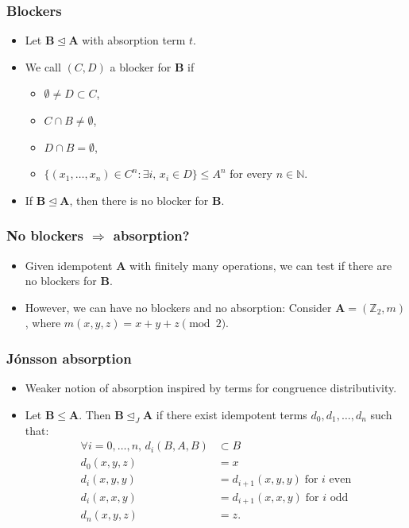 \documentclass[violet,handout]{beamer}
\def\algA{{\mathbf A}}
\def\algB{{\mathbf B}}
\def\absorbs{\operatorname{\trianglelefteq}}
\def\zet{{\mathbb Z}}
\def\en{{\mathbb N}}
\begin{document}
    \begin{frame}
      \frametitle{Blockers}
      \begin{itemize}
	\pause\item Let $\algB\absorbs \algA$ with absorption term $t$.
	\pause\item We call $(C,D)$ a \alert{blocker} for $\algB$ if
	  \begin{itemize}
	    \item $\emptyset\neq D\subset C$,
	    \item $C\cap B\neq \emptyset$,
	    \item $D\cap B=\emptyset$,
	    \item $\{(x_1,\dots,x_n)\in C^n :\exists i,\,
	  x_i\in D\} \leq A^n$ for every $n\in\en$.
      \end{itemize}
	\pause\item If $\algB\absorbs \algA$, then there is no blocker for $\algB$.
      \end{itemize}
    \end{frame}
    \begin{frame}
      \frametitle{No blockers $\Rightarrow$ absorption?}
      \begin{itemize}
	\pause\item Given idempotent $\algA$ with finitely many operations, we can test if there are
	  no blockers for $\algB$.
	\pause\item However, we can have no blockers and no absorption: Consider
	  $\algA=(\zet_2,m)$, where $m(x,y,z)=x+y+z \pmod 2$.
      \end{itemize}
    \end{frame}
    \begin{frame}
      \frametitle{Jónsson absorption}
  \begin{itemize}
      \pause\item Weaker notion of absorption inspired by terms for congruence
	distributivity.
    \pause\item Let $\algB\leq \algA$.  Then $\algB\absorbs_J \algA$ if there exist idempotent 
      terms $d_0,d_1,\dots,d_n$ such that:
 \begin{align*}
     \forall i=0,\dots,n,\,d_i(B,A,B)&\subset B\\
     d_0(x,y,z)&=x\\
     d_i(x,y,y)&=d_{i+1}(x,y,y)\; \text{for $i$ even}\\
     d_i(x,x,y)&=d_{i+1}(x,x,y)\; \text{for $i$ odd}\\
     d_n(x,y,z)&=z.
 \end{align*}
 \end{itemize}
    \end{frame}
\end{document}
